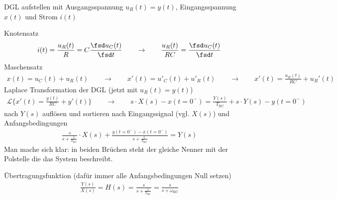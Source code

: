 \begin{Ansatz}
DGL aufstellen mit Ausgangsspannung $u_R(t) = y(t)$, Eingangsspannung $x(t)$ und Strom $i(t)$

\noindent Knotensatz
\begin{align}
i(t) = \frac{u_R(t)}{R} = C\frac{\fsd u_C(t)}{\fsd t} \qquad\rightarrow\qquad \frac{u_R(t)}{R C} = \frac{\fsd u_C(t)}{\fsd t}
\end{align}
%
Maschensatz
\begin{align}
x(t) = u_C(t) + u_R(t) \qquad\rightarrow\qquad x'(t) = u'_C(t) + u'_R(t) \qquad\rightarrow\qquad
x'(t) = \frac{u_R(t)}{R C} + u_R'(t)
\end{align}
%
Laplace Transformation der DGL (jetzt mit $u_R(t) = y(t)$)
\begin{align}
\mathcal{L}\{x'(t) = \frac{y(t)}{R C} + y'(t)\} \qquad\rightarrow\qquad
s \cdot X(s) - x(t=0^-) = \frac{Y(s)}{T_\text{RC}} + s \cdot Y(s) - y(t=0^-)
\end{align}
%
nach $Y(s)$ auflösen und sortieren nach Eingangssignal (vgl. $X(s)$) und Anfangsbedingungen
\begin{align}
\frac{s}{s + \frac{1}{T_\text{RC}}} \cdot X(s) + \frac{y(t=0^-) - x(t=0^-)}{s + \frac{1}{T_\text{RC}}} = Y(s)
\end{align}
%
Man mache sich klar: in beiden Brüchen steht der gleiche Nenner mit der Polstelle die das System beschreibt.

Übertragungsfunktion (dafür immer alle Anfangsbedingungen Null setzen)
\begin{align}
\frac{Y(s)}{X(s)} = H(s) = \frac{s}{s + \frac{1}{T_\text{RC}}} = \frac{s}{s + \omega_\text{RC}}
\end{align}
%
\end{Ansatz}

